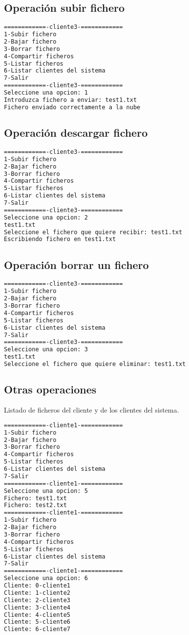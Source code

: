 \subsection{Operación subir fichero}
\begin{lstlisting}[language=bash,frame=single,texcl=true,basicstyle=\small]
============-cliente3-============
1-Subir fichero
2-Bajar fichero
3-Borrar fichero
4-Compartir ficheros
5-Listar ficheros
6-Listar clientes del sistema
7-Salir
============-cliente3-============
Seleccione una opcion: 1
Introduzca fichero a enviar: test1.txt
Fichero enviado correctamente a la nube
\end{lstlisting}
\subsection{Operación descargar fichero}
\begin{lstlisting}[language=bash,frame=single,texcl=true,basicstyle=\small]
============-cliente3-============
1-Subir fichero
2-Bajar fichero
3-Borrar fichero
4-Compartir ficheros
5-Listar ficheros
6-Listar clientes del sistema
7-Salir
============-cliente3-============
Seleccione una opcion: 2
test1.txt 
Seleccione el fichero que quiere recibir: test1.txt
Escribiendo fichero en test1.txt
\end{lstlisting}
\subsection{Operación borrar un fichero}
\begin{lstlisting}[language=bash,frame=single,texcl=true,basicstyle=\small]
============-cliente3-============
1-Subir fichero
2-Bajar fichero
3-Borrar fichero
4-Compartir ficheros
5-Listar ficheros
6-Listar clientes del sistema
7-Salir
============-cliente3-============
Seleccione una opcion: 3
test1.txt 
Seleccione el fichero que quiere eliminar: test1.txt
\end{lstlisting}
\subsection{Otras operaciones}
Listado de ficheros del cliente y de los clientes del sistema.

\begin{lstlisting}[language=bash,frame=single,texcl=true,basicstyle=\small]
============-cliente1-============
1-Subir fichero
2-Bajar fichero
3-Borrar fichero
4-Compartir ficheros
5-Listar ficheros
6-Listar clientes del sistema
7-Salir
============-cliente1-============
Seleccione una opcion: 5   
Fichero: test1.txt
Fichero: test2.txt
============-cliente1-============
1-Subir fichero
2-Bajar fichero
3-Borrar fichero
4-Compartir ficheros
5-Listar ficheros
6-Listar clientes del sistema
7-Salir
============-cliente1-============
Seleccione una opcion: 6
Cliente: 0-cliente1
Cliente: 1-cliente2
Cliente: 2-cliente3
Cliente: 3-cliente4
Cliente: 4-cliente5
Cliente: 5-cliente6
Cliente: 6-cliente7
\end{lstlisting}
